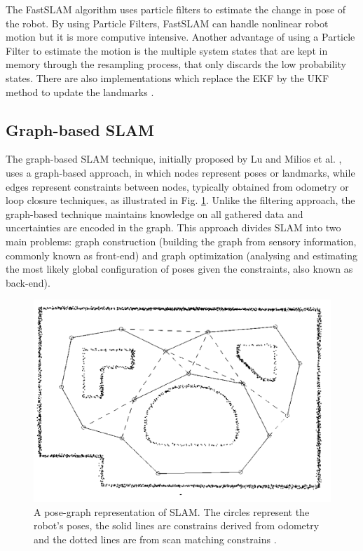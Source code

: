 The FastSLAM algorithm \cite{thrun_fastslam_nodate} uses particle filters to estimate the change in pose of the robot. By using Particle Filters, FastSLAM can handle nonlinear robot motion but it is more computive intensive. Another advantage of using a Particle Filter to estimate the motion is the multiple system states that are kept in memory through the resampling process, that only discards the low probability states. There are also implementations which replace the \acs*{EKF} by the \acs*{UKF} method to update the landmarks \cite{wang_upf-ukf_2007}.


\subsection{Graph-based \acs*{SLAM}}

The graph-based \acs*{SLAM} technique, initially proposed by Lu and Milios et al. \cite{lu_globally_1997}, uses a graph-based approach, in which nodes represent poses or landmarks, while edges represent constraints between nodes, typically obtained from odometry or loop closure techniques, as illustrated in Fig. \ref*{fig: graph SLAM}. Unlike the filtering approach, the graph-based technique maintains knowledge on all gathered data and uncertainties are encoded in the graph. This approach divides \acs*{SLAM} into two main problems: graph construction (building the graph from sensory information, commonly known as front-end) and graph optimization (analysing and estimating the most likely global configuration of poses given the constraints, also known as back-end).

\begin{figure}[H]
    \centering
    \includegraphics[width=0.7\linewidth]{images/background/graph_SLAM.png}
    \caption{A pose-graph representation of \acs*{SLAM}. The circles represent the robot's poses, the solid lines are constrains derived from odometry and the dotted lines are from scan matching constrains \cite{lu_globally_1997}.}
    \label{fig: graph SLAM}
\end{figure}

